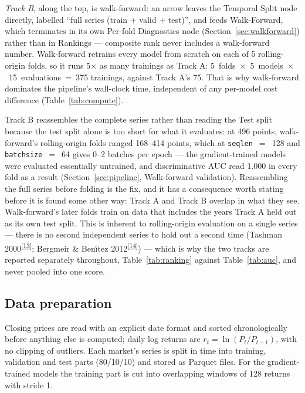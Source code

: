\documentclass[11pt,a4paper]{article}
\makeatletter
\newcommand{\tcite}[1]{\textsuperscript{[\hyperlink{R:#1}{#1}]}}
\DeclareRobustCommand{\_}{\ifmmode\nfss@text{\textunderscore}\else\textunderscore\allowbreak\fi}
\makeatother
\begin{document}
\emph{Track B}, along the top, is walk-forward: an arrow leaves the Temporal Split node directly, labelled ``full series (train + valid + test)'', and feeds Walk-Forward, which terminates in its own Per-fold Diagnostics node (Section~\ref{sec:walkforward}) rather than in Rankings --- composite rank never includes a walk-forward number. Walk-forward retrains every model from scratch on each of 5 rolling-origin folds, so it runs 5$\times$ as many trainings as Track A: 5~folds~$\times$~5~models~$\times$~15~evaluations~=~375 trainings, against Track A's 75. That is why walk-forward dominates the pipeline's wall-clock time, independent of any per-model cost difference (Table~\ref{tab:compute}).

Track B reassembles the complete series rather than reading the Test split because the test split alone is too short for what it evaluates: at 496 points, walk-forward's rolling-origin folds ranged 168--414 points, which at \texttt{seq\_len}~$=$~128 and \texttt{batch\_size}~$=$~64 gives 0--2 batches per epoch --- the gradient-trained models were evaluated essentially untrained, and discriminative AUC read 1.000 in every fold as a result (Section~\ref{sec:pipeline}, Walk-forward validation). Reassembling the full series before folding is the fix, and it has a consequence worth stating before it is found some other way: Track A and Track B overlap in what they see. Walk-forward's later folds train on data that includes the years Track A held out as its own test split. This is inherent to rolling-origin evaluation on a single series --- there is no second independent series to hold out a second time (Tashman 2000\tcite{13}; Bergmeir \& Ben\'{\i}tez 2012\tcite{14}) --- which is why the two tracks are reported separately throughout, Table~\ref{tab:ranking} against Table~\ref{tab:auc}, and never pooled into one score.

\subsection{Data preparation}
Closing prices are read with an explicit date format and sorted chronologically before anything else is computed; daily log returns are $r_t=\ln(P_t/P_{t-1})$, with no clipping of outliers. Each market's series is split in time into training, validation and test parts (80/10/10) and stored as Parquet files. For the gradient-trained models the training part is cut into overlapping windows of 128 returns with stride 1.
\end{document}
